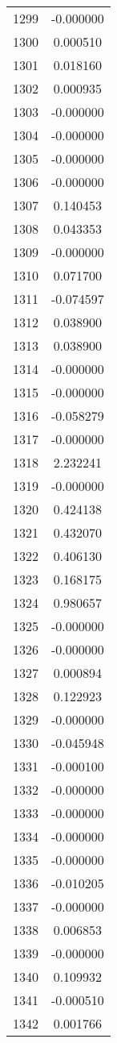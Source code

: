 \documentclass[12pt]{article}
\begin{document}
\begin{longtable}{@{}cc@{}}
1299 & -0.000000 \\
1300 & 0.000510 \\
1301 & 0.018160 \\
1302 & 0.000935 \\
1303 & -0.000000 \\
1304 & -0.000000 \\
1305 & -0.000000 \\
1306 & -0.000000 \\
1307 & 0.140453 \\
1308 & 0.043353 \\
1309 & -0.000000 \\
1310 & 0.071700 \\
1311 & -0.074597 \\
1312 & 0.038900 \\
1313 & 0.038900 \\
1314 & -0.000000 \\
1315 & -0.000000 \\
1316 & -0.058279 \\
1317 & -0.000000 \\
1318 & 2.232241 \\
1319 & -0.000000 \\
1320 & 0.424138 \\
1321 & 0.432070 \\
1322 & 0.406130 \\
1323 & 0.168175 \\
1324 & 0.980657 \\
1325 & -0.000000 \\
1326 & -0.000000 \\
1327 & 0.000894 \\
1328 & 0.122923 \\
1329 & -0.000000 \\
1330 & -0.045948 \\
1331 & -0.000100 \\
1332 & -0.000000 \\
1333 & -0.000000 \\
1334 & -0.000000 \\
1335 & -0.000000 \\
1336 & -0.010205 \\
1337 & -0.000000 \\
1338 & 0.006853 \\
1339 & -0.000000 \\
1340 & 0.109932 \\
1341 & -0.000510 \\
1342 & 0.001766 \\

\end{longtable}
\end{document}
